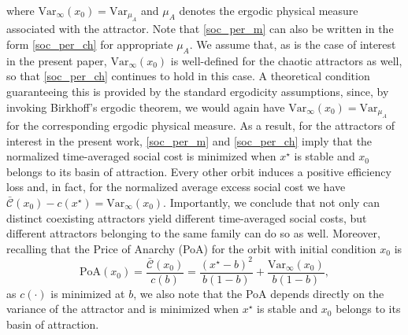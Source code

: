 \documentclass{article}
\theoremstyle{plain}
\theoremstyle{definition}
\begin{document}
where $\mathrm{Var}_{\infty}(x_0)=\mathrm{Var}_{\mu_A}$ and $\mu_A$ denotes the ergodic physical measure associated with the attractor. Note that \eqref{soc_per_m} can also be written in the form \eqref{soc_per_ch} for appropriate $\mu_A$. We assume that, as is the case of interest in the present paper, $\mathrm{Var}_{\infty}(x_0)$ is well-defined for the chaotic attractors as well, so that \eqref{soc_per_ch} continues to hold in this case. A theoretical condition guaranteeing this is provided by the standard ergodicity assumptions, since, by invoking Birkhoff's ergodic theorem, we would again have $\mathrm{Var}_{\infty}(x_0)=\mathrm{Var}_{\mu_A}$ for the corresponding ergodic physical measure. As a result, for the attractors of interest in the present work, \eqref{soc_per_m} and \eqref{soc_per_ch} imply that the normalized time-averaged social cost is minimized when $x^\star$ is stable and $x_0$ belongs to its basin of attraction. Every other orbit induces a positive efficiency loss and, in fact, for the normalized average excess social cost we have $\bar{\mathcal{C}}(x_0)-c(x^\star)=\mathrm{Var}_{\infty}(x_0)$. Importantly, we conclude that not only can distinct coexisting attractors yield different time-averaged social costs, but different attractors belonging to the same family can do so as well. Moreover, recalling that the Price of Anarchy (PoA) \cite{chotibut2} for the orbit with initial condition $x_0$ is
\begin{equation}
\mathrm{PoA}(x_0)=\frac{\bar{\mathcal{C}}(x_0)}{c(b)}=\frac{(x^\star-b)^2}{b(1-b)}+\frac{\mathrm{Var}_{\infty}(x_0)}{b(1-b)},
\label{anarchy}
\end{equation}
as $c(\cdot)$ is minimized at $b$, we also note that the PoA depends directly on the variance of the attractor and is minimized when $x^\star$ is stable and $x_0$ belongs to its basin of attraction.



\end{document}
